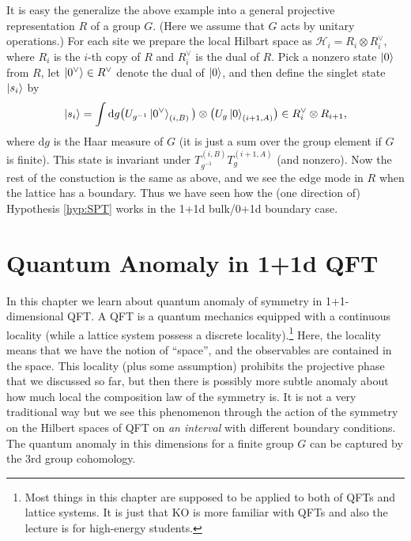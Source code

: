 \documentclass[
]{scrartcl}
\numberwithin{equation}{section}
\theoremstyle{definition}
\theoremstyle{definition}
\theoremstyle{definition}
\theoremstyle{definition}
\theoremstyle{remark}
\begin{document}
It is easy the generalize the above example into a general projective representation \(R\) of a group \(G\). (Here we assume that \(G\) acts by unitary operations.)
For each site we prepare the local Hilbart space as \(\mathcal{H}_i = R_i \otimes R^\vee_i\), where \(R_i\) is the \(i\)-th copy of \(R\) and \(R^\vee_i\) is the dual of \(R\).
Pick a nonzero state \(\ket{0}\) from \(R\), let \(\ket{0^\vee} \in R^\vee\) denote the dual of \(\ket{0}\), and then define the singlet state \(\ket{s_i}\) by
\begin{equation}
  \label{eq:ketsiGeneral}
  \ket{s_i} = \int \mathrm{d}g \bigl(U_{g^{-1}}\ket{0^\vee}_{(i,B)}\big)\otimes \bigl(U_{g}\ket{0}_{(i+1,A)}\bigr) \in R_{i}^\vee \otimes R_{i+1},
\end{equation}
where \(\mathrm{d}g\) is the Haar measure of \(G\) (it is just a sum over the group element if \(G\) is finite).
This state is invariant under \(T_{g^{-1}}^{(i,B)}T_g^{(i+1,A)}\) (and nonzero).
Now the rest of the constuction is the same as above, and we see the edge mode in \(R\) when the lattice has a boundary.
Thus we have seen how the (one direction of) Hypothesis \ref{hyp:SPT} works in the 1+1d bulk/0+1d boundary case.

\hypertarget{quantum-anomaly-in-11d-qft}{%
\section{Quantum Anomaly in 1+1d QFT}\label{quantum-anomaly-in-11d-qft}}

In this chapter we learn about quantum anomaly of symmetry in 1+1-dimensional QFT. A QFT is a quantum mechanics equipped with a continuous locality (while a lattice system possess a discrete locality).\footnote{Most things in this chapter are supposed to be applied to both of QFTs and lattice systems. It is just that KO is more familiar with QFTs and also the lecture is for high-energy students.} Here, the locality means that we have the notion of ``space'', and the observables are contained in the space.
This locality (plus some assumption) prohibits the projective phase that we discussed so far, but then there is possibly more subtle anomaly about how much local the composition law of the symmetry is.
It is not a very traditional way but we see this phenomenon through the action of the symmetry on the Hilbert spaces of QFT on \emph{an interval} with different boundary conditions. The quantum anomaly in this dimensions for a finite group \(G\) can be captured by the 3rd group cohomology.
\end{document}
